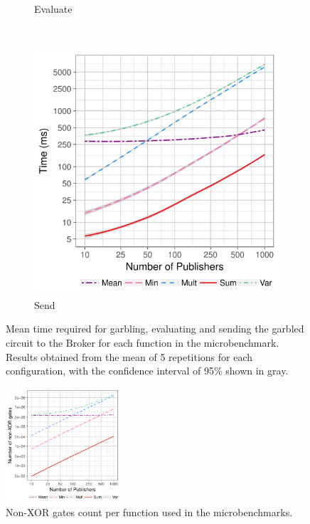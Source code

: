 \begin{figure}
\begin{subfigure}[b]{0.32\textwidth}
        \caption{Evaluate}
        \label{fig:micro-eval-time}
    \end{subfigure}
    ~ %
    \begin{subfigure}[b]{0.32\textwidth}
        \includegraphics[width=\textwidth]{plots/send_loglog.png}
        \caption{Send}
        \label{fig:micro-send-time}
    \end{subfigure}
    \caption{Mean time required for garbling, evaluating and sending the
      garbled circuit to the Broker for each function in the microbenchmark.
      Results obtained from the mean of 5 repetitions for each configuration,
      with the confidence interval of 95\% shown in gray.}
    \label{fig:micro-times}
\end{figure}


\begin{figure}
  \includegraphics[width=0.38\textwidth]{plots/nonxor_gates_log.png}
  \caption{Non-XOR gates count per function used in the microbenchmarks.}
  \label{micro-nonxor}
\end{figure}

